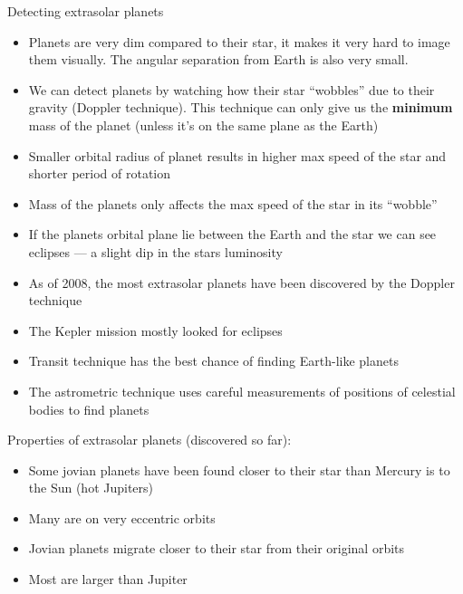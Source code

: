 \documentclass[12pt]{article}
\begin{document}
Detecting extrasolar planets
\begin{itemize}
\item Planets are very dim compared to their star, it makes it very hard to image them visually.  The angular separation from Earth is also very small.
\item We can detect planets by watching how their star ``wobbles'' due to their gravity (Doppler technique).  This technique can only give us the \textbf{minimum} mass of the planet (unless it's on the same plane as the Earth)
\item Smaller orbital radius of planet results in higher max speed of the star and shorter period of rotation
\item Mass of the planets only affects the max speed of the star in its ``wobble''
\item If the planets orbital plane lie between the Earth and the star we can see eclipses --- a slight dip in the stars luminosity
\item As of 2008, the most extrasolar planets have been discovered by the Doppler technique
\item The Kepler mission mostly looked for eclipses
\item Transit technique has the best chance of finding Earth-like planets
\item The astrometric technique uses careful measurements of positions of celestial bodies to find planets
\end{itemize}

Properties of extrasolar planets (discovered so far):
\begin{itemize}
\item Some jovian planets have been found closer to their star than Mercury is to the Sun (hot Jupiters)
\item Many are on very eccentric orbits
\item Jovian planets migrate closer to their star from their original orbits
\item Most are larger than Jupiter
\end{itemize}
\end{document}
